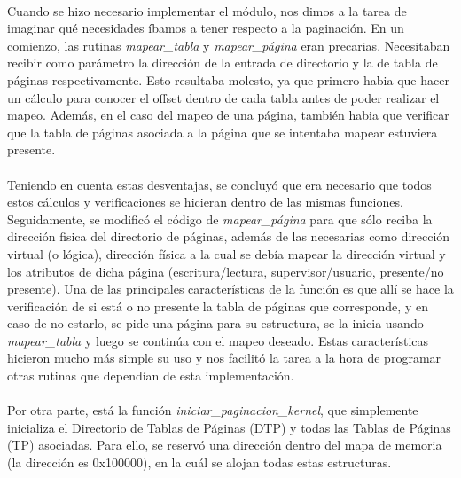 \documentclass[11pt, a4paper]{article}
\begin{document}
			\paragraph{}
			Cuando se hizo necesario implementar el módulo, nos dimos a la tarea de imaginar qué necesidades íbamos a tener respecto a la paginación. En un comienzo, las rutinas \textit{mapear\_tabla} y \textit{mapear\_página} eran precarias. Necesitaban recibir como parámetro la dirección de la entrada de directorio y la de tabla de páginas respectivamente. Esto resultaba molesto, ya que primero habia que hacer un cálculo para conocer el offset dentro de cada tabla antes de poder realizar el mapeo. Además, en el caso del mapeo de una página, también habia que verificar que la tabla de páginas asociada a la página que se intentaba mapear estuviera presente.
			
			\paragraph{}
			Teniendo en cuenta estas desventajas, se concluyó que era necesario que todos estos cálculos y verificaciones se hicieran dentro de las mismas funciones. Seguidamente, se modificó el código de \textit{mapear\_página} para que sólo reciba la dirección fisica del directorio de páginas, además de las necesarias como dirección virtual (o lógica), dirección física a la cual se debía mapear la dirección virtual y los atributos de dicha página (escritura/lectura, supervisor/usuario, presente/no presente). Una de las principales características de la función es que allí se hace la verificación de si está o no presente la tabla de páginas que corresponde, y en caso de no estarlo, se pide una página para su estructura, se la inicia usando \textit{mapear\_tabla} y luego se continúa con el mapeo deseado. Estas características hicieron mucho más simple su uso y nos facilitó la tarea a la hora de programar otras rutinas que dependían de esta implementación.
			
			\paragraph{}
			Por otra parte, está la función \textit{iniciar\_paginacion\_kernel}, que simplemente inicializa el Directorio de Tablas de Páginas (DTP) y todas las Tablas de Páginas (TP) asociadas. Para ello, se reservó una dirección dentro del mapa de memoria (la dirección es 0x100000), en la cuál se alojan todas estas estructuras.
			
\end{document}
